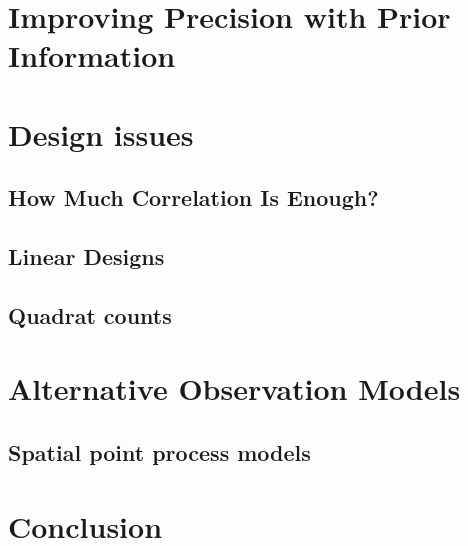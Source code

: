 \begin{figure}
  \centering
   \label{fig:prior}
\end{figure}




\begin{figure}
  \centering
  \label{fig:nopaDen}
\end{figure}


\section{Improving Precision with Prior Information}
\label{Sect.precision}




\section{Design issues}

\subsection{How Much Correlation Is Enough?}

\subsection{Linear Designs}


\subsection{Quadrat counts}





\section{Alternative Observation Models}
\label{Sect.alt-obsmods}



\subsection{Spatial point process models}




\section{Conclusion}

